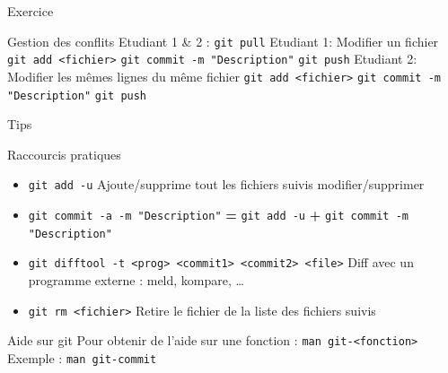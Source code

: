 \documentclass{beamer}
\begin{document}
\begin{frame}[fragile]{Exercice}
  \begin{exampleblock}{Gestion des conflits}
    Etudiant 1 \& 2 :\linebreak
    \textcolor{commandcolor}{\verb?git pull?}\linebreak
    \linebreak
    Etudiant 1:\linebreak
    Modifier un fichier\linebreak
    \textcolor{commandcolor}{\verb?git add <fichier>?}\linebreak
    \textcolor{commandcolor}{\verb?git commit -m "Description"?}\linebreak
    \textcolor{commandcolor}{\verb?git push?}\linebreak
    \linebreak
    Etudiant 2:\linebreak
    Modifier les mêmes lignes du même fichier\linebreak
    \textcolor{commandcolor}{\verb?git add <fichier>?}\linebreak
    \textcolor{commandcolor}{\verb?git commit -m "Description"?}\linebreak
    \textcolor{commandcolor}{\verb?git push?}
  \end{exampleblock}
\end{frame}

\begin{frame}[fragile]{Tips}
  \begin{block}{Raccourcis pratiques}
    \begin{itemize}
    \item \textcolor{commandcolor}{\verb?git add -u?}\linebreak
      Ajoute/supprime tout les fichiers suivis modifier/supprimer
    \item \textcolor{commandcolor}{\verb?git commit -a -m "Description"?}\linebreak
      \textbf{=} \textcolor{commandcolor}{\verb?git add -u?} \textbf{+} \textcolor{commandcolor}{\verb?git commit -m "Description"?}
    \item \textcolor{commandcolor}{\verb?git difftool -t <prog> <commit1> <commit2> <file>?}\linebreak
      Diff avec un programme externe : meld, kompare, \dots
    \item \textcolor{commandcolor}{\verb?git rm <fichier>?}\linebreak
      Retire le fichier de la liste des fichiers suivis
    \end{itemize}
  \end{block}  
  
  \begin{alertblock}{Aide sur git}
    Pour obtenir de l'aide sur une fonction :\linebreak
    \textcolor{commandcolor}{\verb?man git-<fonction>?}\linebreak
    Exemple : 
    \textcolor{commandcolor}{\verb?man git-commit?}
  \end{alertblock}
  
\end{frame}
\end{document}
